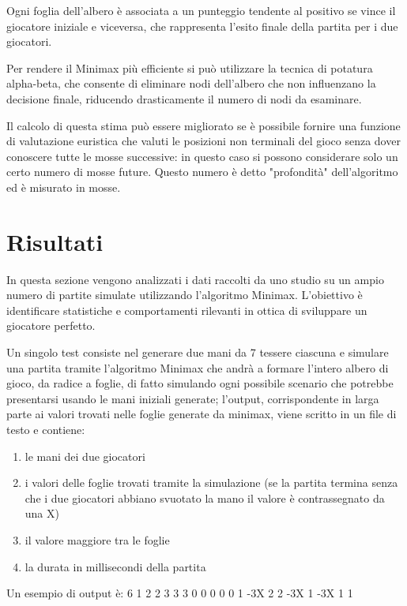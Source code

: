 \documentclass[a4paper,12pt]{report}
\begin{document}
Ogni foglia dell’albero è associata a un punteggio tendente al positivo se vince il giocatore iniziale e viceversa, che rappresenta l’esito finale della partita per i due giocatori. 

Per rendere il Minimax più efficiente si può utilizzare la tecnica di potatura alpha-beta, che consente di eliminare nodi dell’albero che non influenzano la decisione finale, riducendo drasticamente il numero di nodi da esaminare. 

Il calcolo di questa stima può essere migliorato se è possibile fornire una funzione di valutazione euristica che valuti le posizioni non terminali del gioco senza dover conoscere tutte le mosse successive: in questo caso si possono considerare solo un certo numero di mosse future. 
Questo numero è detto "profondità" dell'algoritmo ed è misurato in mosse.

\chapter{Risultati}

In questa sezione vengono analizzati i dati raccolti da uno studio su un ampio numero di partite simulate utilizzando l'algoritmo Minimax. 
L'obiettivo è identificare statistiche e comportamenti rilevanti in ottica di sviluppare un giocatore perfetto.

Un singolo test consiste nel generare due mani da 7 tessere ciascuna e simulare una partita tramite l'algoritmo Minimax che andrà a formare l'intero albero di gioco, da radice a foglie, di fatto simulando ogni possibile scenario che potrebbe presentarsi usando le mani iniziali generate; l'output, corrispondente in larga parte ai valori trovati nelle foglie generate da minimax, viene scritto in un file di testo e contiene:

\begin{enumerate}
    \item le mani dei due giocatori
    \item i valori delle foglie trovati tramite la simulazione (se la partita termina senza che i due giocatori abbiano svuotato la mano il valore è contrassegnato da una X)
    \item il valore maggiore tra le foglie
    \item la durata in millisecondi della partita
\end{enumerate}

Un esempio di output è: 6 1 2 2 3 3 3   0 0 0 0 0 1   \quad   -3X 2 2 -3X 1 -3X 1 1      
\end{document}
